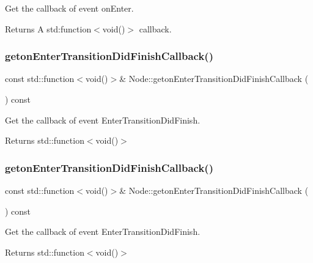 Get the callback of event on\+Enter. \begin{DoxyReturn}{Returns}
A std\+:function$<$void()$>$ callback. 
\end{DoxyReturn}
\mbox{\label{classNode_af905ed9ea4b7884fdb9be2b8b2fbcf53}} 
\subsubsection{\texorpdfstring{geton\+Enter\+Transition\+Did\+Finish\+Callback()}{getonEnterTransitionDidFinishCallback()}\hspace{0.1cm}{\footnotesize\ttfamily [1/2]}}
{\footnotesize\ttfamily const std\+::function$<$void()$>$\& Node\+::geton\+Enter\+Transition\+Did\+Finish\+Callback (\begin{DoxyParamCaption}{ }\end{DoxyParamCaption}) const\hspace{0.3cm}{\ttfamily [inline]}}

Get the callback of event Enter\+Transition\+Did\+Finish. \begin{DoxyReturn}{Returns}
std\+::function$<$void()$>$ 
\end{DoxyReturn}
\mbox{\label{classNode_af905ed9ea4b7884fdb9be2b8b2fbcf53}} 
\subsubsection{\texorpdfstring{geton\+Enter\+Transition\+Did\+Finish\+Callback()}{getonEnterTransitionDidFinishCallback()}\hspace{0.1cm}{\footnotesize\ttfamily [2/2]}}
{\footnotesize\ttfamily const std\+::function$<$void()$>$\& Node\+::geton\+Enter\+Transition\+Did\+Finish\+Callback (\begin{DoxyParamCaption}{ }\end{DoxyParamCaption}) const\hspace{0.3cm}{\ttfamily [inline]}}

Get the callback of event Enter\+Transition\+Did\+Finish. \begin{DoxyReturn}{Returns}
std\+::function$<$void()$>$ 
\end{DoxyReturn}
\mbox{\label{classNode_ab0b4c33e5b8ef5770d0f4d8ed410e596}} 
